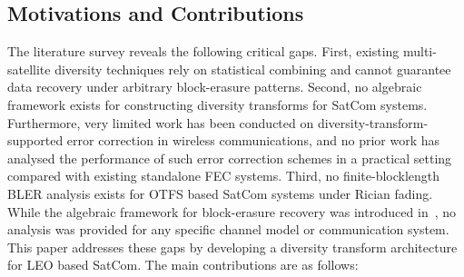 \documentclass[journal]{IEEEtran}
\begin{document}
\subsection{Motivations and Contributions}
\label{sec:motivations_contributions}
The literature survey reveals the following critical gaps. First, existing multi-satellite diversity techniques rely on statistical combining and cannot
  guarantee data recovery under arbitrary block-erasure patterns. Second, no algebraic framework exists for constructing diversity transforms for SatCom
  systems. Furthermore, very limited work has been conducted on diversity-transform-supported error correction in wireless communications, and no prior work has analysed the performance of such error correction schemes in a practical setting compared with existing standalone FEC systems. Third, no
  finite-blocklength BLER analysis exists for OTFS based SatCom systems under Rician fading. While the algebraic framework for block-erasure recovery was introduced in~\cite{Arikan2025_patent}, no analysis was provided for any specific channel model or communication system. This paper addresses these gaps by
  developing a diversity transform architecture for LEO based SatCom. The main contributions are as follows:
\end{document}
